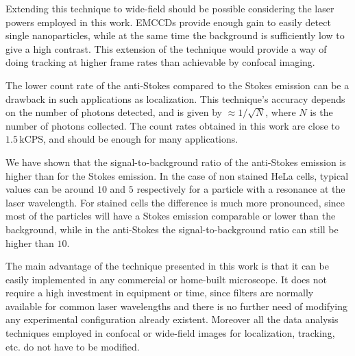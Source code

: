 \documentclass[journal=nalefd,manuscript=letter]{achemso}
\newcommand{\kCPS}{\ensuremath{\,\textrm{kCPS}}}
\begin{document}
Extending this technique to wide-field should be possible considering the laser
powers employed in this work. EMCCDs provide enough gain\cite{Dussault2004} to
easily detect single nanoparticles, while at the same time the background is
sufficiently low to give a high contrast. This extension of the technique would
provide a way of doing tracking at higher frame rates than achievable by
confocal imaging.

The lower count rate of the anti-Stokes compared to the Stokes emission can be a
drawback in such applications as localization\cite{Sahl2013}. This technique's
accuracy depends on the number of photons detected, and is given by $\approx
1/\sqrt{N}$, where $N$ is the number of photons collected. The count rates
obtained in this work are close to $1.5\kCPS$, and should be enough
for many applications. 

We have shown that the signal-to-background ratio of the anti-Stokes emission is
higher than for the Stokes emission. In the case of non stained HeLa cells,
typical values can be around $10$ and $5$ respectively for a particle with a
resonance at the laser wavelength. For stained cells the difference is
much more pronounced, since most of the particles will have a Stokes emission
comparable or lower than the background, while in the anti-Stokes the
signal-to-background ratio can still be higher than $10$.

The main advantage of the technique presented in this work is that it can be
easily implemented in any commercial or home-built microscope. It does not
require a high investment in equipment or time, since filters are normally
available for common laser wavelengths and there is no further need of modifying
any experimental configuration already existent. Moreover all the data analysis
techniques employed in confocal or wide-field images for localization, tracking,
etc. do not have to be modified.


\end{document}
